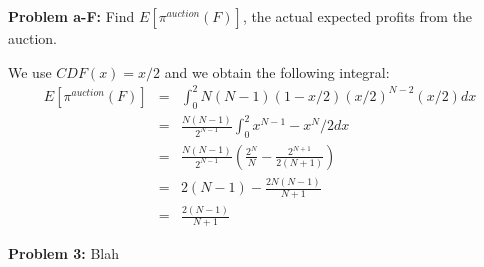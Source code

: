 \documentclass[psamsfonts]{amsart}
\newenvironment{sol}{\vspace{0.25cm}{\large \bfseries Solution:}}{\qedsymbol}
\newenvironment{prob}[1]{\begin{framed}{\large \bfseries Problem #1:}}{\end{framed}}
\begin{document}
\begin{prob}{a-F}
Find $E[\pi^{auction}(F)]$, the actual expected profits from the auction.
\end{prob}
\begin{sol}
We use $CDF(x) = x/2$ and we obtain the following integral:
\begin{eqnarray}
E[\pi^{auction}(F)] &=& \int_0^2 N(N-1) (1 - x/2)(x/2)^{N-2} (x/2) dx \\
&=& \frac{N(N-1)}{2^{N-1}} \int_0^2 x^{N-1} - x^{N}/2 dx \\
&=& \frac{N(N-1)}{2^{N-1}} \left( \frac{2^N}{N} - \frac{2^{N+1}}{2(N+1)} \right) \\
&=& 2(N-1) - \frac{2N(N-1)}{N+1} \\
&=& \frac{2(N-1)}{N+1}
\end{eqnarray}
\end{sol}

\begin{prob}{3}
Blah
\end{prob}
\end{document}
